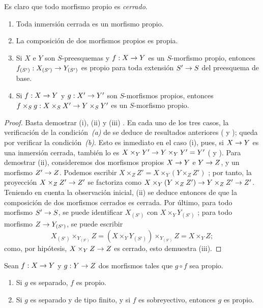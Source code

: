 \documentclass[oneside,10pt]{amsart}
\makeatletter
\newcommand{\ega@arrow}[2]{\mathchoice{#1}{#2}{#2}{#2}}
\renewcommand{\to}{\ega@arrow{\longrightarrow}{\rightarrow}}
\newcommand{\oldpage}[2][]{\marginnote{\normalfont\footnotesize\textbf{#1}~|~#2}\ignorespaces}
\let\EGAOriginalLabel\label
\renewcommand{\label}[1]{\phantomsection\EGAOriginalLabel{#1}}
\makeatother
\begin{document}
Es claro que todo morfismo propio es \emph{cerrado}.

\begin{proposition}[5.4.2]
\label{II.5.4.2}
\medskip\noindent
\begin{enumerate}
  \item[{\rm(i)}] Toda inmersión cerrada es un morfismo propio.
  \item[{\rm(ii)}] La composición de dos morfismos propios es propia.
  \item[{\rm(iii)}] Si $X$ e $Y$ son $S$-preesquemas y $f:X\to Y$ es un $S$-morfismo propio, entonces $f_{(S')}:X_{(S')}\to Y_{(S')}$ es propio para toda extensión $S'\to S$ del preesquema de base.
  \item[{\rm(iv)}] Si $f:X\to Y$ y $g:X'\to Y'$ son $S$-morfismos propios, entonces $f\times_S g:X\times_S X'\to Y\times_S Y'$ es un $S$-morfismo propio.
\end{enumerate}
\end{proposition}

\oldpage[II]{101}
\begin{proof}
Basta demostrar (i), (ii) y (iii) .
En cada uno de los tres casos, la verificación de la condición~\emph{(a)} de  se deduce de resultados anteriores ( y ); queda por verificar la condición~\emph{(b)}.
Esto es inmediato en el caso (i), pues, si $X\to Y$ es una inmersión cerrada, también lo es $X\times_Y Y'\to Y\times_Y Y'=Y'$ ( y ).
Para demostrar (ii), consideremos dos morfismos propios $X\to Y$ e $Y\to Z$, y un morfismo $Z'\to Z$.
Podemos escribir $X\times_Z Z'=X\times_Y(Y\times_Z Z')$ ; por tanto, la proyección $X\times_Z Z'\to Z'$ se factoriza como $X\times_Y(Y\times_Z Z')\to Y\times_Z Z'\to Z'$.
Teniendo en cuenta la observación inicial, (ii) se deduce entonces de que la composición de dos morfismos cerrados es cerrada.
Por último, para todo morfismo $S'\to S$, se puede identificar $X_{(S')}$ con $X\times_Y Y_{(S')}$ ; para todo morfismo $Z\to Y_{(S')}$, se puede escribir
\[
  X_{(S')}\times_{Y_{(S')}}Z=(X\times_Y Y_{(S')})\times_{Y_{(S')}}Z=X\times_Y Z;
\]
como, por hipótesis, $X\times_Y Z\to Z$ es cerrado, esto demuestra (iii).
\end{proof}

\begin{corollary}[5.4.3]
\label{II.5.4.3}
Sean $f:X\to Y$ y $g:Y\to Z$ dos morfismos tales que $g\circ f$ sea propio.
\begin{enumerate}
  \item[{\rm(i)}] Si $g$ es separado, $f$ es propio.
  \item[{\rm(ii)}] Si $g$ es separado y de tipo finito, y si $f$ es sobreyectivo, entonces $g$ es propio.
\end{enumerate}
\end{corollary}
\end{document}
